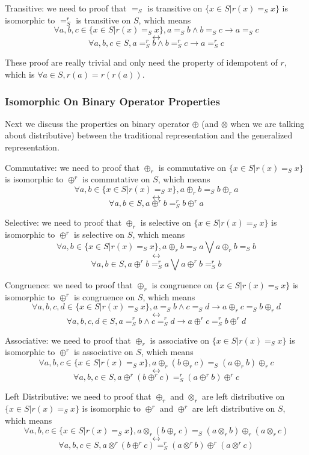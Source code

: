 \documentclass[a4paper,12pt,twoside,openright]{report}
\begin{document}
Transitive: we need to proof that $=_S$ is transitive on $\{x \in S | r(x) =_S x \}$ is isomorphic to $=^r_S$ is transitive on $S$, which means 
\[\forall a,b,c \in \{x \in S | r(x) =_S x \}, a =_S b \wedge b =_S c \rightarrow a =_S c \]
\[\longleftrightarrow \]
\[\forall a,b,c \in S, a =^r_S b \wedge b =^r_S c \rightarrow a =^r_S c
\]

These proof are really trivial and only need the property of idempotent of $r$, which is $\forall a \in S, r(a) = r(r(a))$.

\subsubsection{Isomorphic On Binary Operator Properties}
Next we discuss the properties on binary operator $\oplus$ (and $\otimes$ when we are talking about distributive) between the traditional representation and the generalized representation.

Commutative: we need to proof that $\oplus_r$ is commutative on $\{x \in S | r(x) =_S x\}$ is isomorphic to $\oplus^r$ is commutative on $S$, which means 
\[\forall a,b \in \{x \in S | r(x) =_S x \}, a \oplus_r b =_S b \oplus_r a \]
\[\longleftrightarrow \]
\[\forall a,b \in S, a \oplus^r b =^r_S b \oplus^r a
\]

Selective:  we need to proof that $\oplus_r$ is selective on $\{x \in S | r(x) =_S x\}$ is isomorphic to $\oplus^r$ is selective on $S$, which means 
\[\forall a,b \in \{x \in S | r(x) =_S x\}, a \oplus_r b =_S a \bigvee a \oplus_r b =_S b \]
\[\longleftrightarrow \]
\[\forall a,b \in S, a \oplus^r b =^r_S a \bigvee a \oplus^r b =^r_S b
\]

Congruence: we need to proof that $\oplus_r$ is congruence on $\{x \in S | r(x) =_S x\}$ is isomorphic to $\oplus^r$ is congruence on $S$, which means 
\[\forall a,b,c,d \in \{x \in S | r(x) =_S x \}, a =_S b \wedge c =_S d \rightarrow a \oplus_r c =_S b \oplus_r d \]
\[\longleftrightarrow \]
\[\forall a,b,c,d \in S, a =^r_S b \wedge c =^r_S d \rightarrow a \oplus^r c =^r_S b \oplus^r d
\]

Associative: we need to proof that $\oplus_r$ is associative on $\{x \in S | r(x) =_S x\}$ is isomorphic to $\oplus^r$ is associative on $S$, which means 
\[\forall a,b,c \in \{x \in S | r(x) =_S x \}, a \oplus_r (b \oplus_r c) =_S (a \oplus_r b) \oplus_r c \]
\[\longleftrightarrow \]
\[\forall a,b,c \in S, a \oplus^r (b \oplus^r c) =^r_S (a \oplus^r b) \oplus^r c
\]

Left Distributive: we need to proof that $\oplus_r$ and $\otimes_r$ are left distributive on $\{x \in S | r(x) =_S x\}$ is isomorphic to $\oplus^r$ and $\oplus^r$ are left distributive on $S$, which means 
\[\forall a,b,c \in \{x \in S | r(x) =_S x \}, a \otimes_r (b \oplus_r c) =_S (a \otimes_r b) \oplus_r (a \otimes_r c) \]
\[\longleftrightarrow \]
\[\forall a,b,c \in S, a \otimes^r (b \oplus^r c) =^r_S (a \otimes^r b) \oplus^r (a \otimes^r c)
\]
\end{document}
